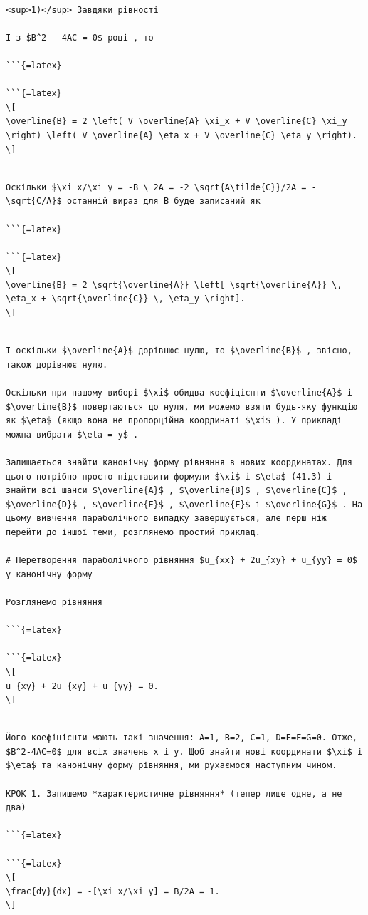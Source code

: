 \documentclass[
]{article}
\begin{document}
\begin{verbatim}

<sup>1)</sup> Завдяки рівності

І з $B^2 - 4AC = 0$ році , то

```{=latex}

```{=latex}
\[
\overline{B} = 2 \left( V \overline{A} \xi_x + V \overline{C} \xi_y \right) \left( V \overline{A} \eta_x + V \overline{C} \eta_y \right).
\]
\end{verbatim}

\begin{verbatim}

Оскільки $\xi_x/\xi_y = -B \ 2A = -2 \sqrt{A\tilde{C}}/2A = -\sqrt{C/A}$ останній вираз для B буде записаний як

```{=latex}

```{=latex}
\[
\overline{B} = 2 \sqrt{\overline{A}} \left[ \sqrt{\overline{A}} \, \eta_x + \sqrt{\overline{C}} \, \eta_y \right].
\]
\end{verbatim}

\begin{verbatim}

І оскільки $\overline{A}$ дорівнює нулю, то $\overline{B}$ , звісно, також дорівнює нулю.

Оскільки при нашому виборі $\xi$ обидва коефіцієнти $\overline{A}$ і $\overline{B}$ повертаються до нуля, ми можемо взяти будь-яку функцію як $\eta$ (якщо вона не пропорційна координаті $\xi$ ). У прикладі можна вибрати $\eta = y$ .

Залишається знайти канонічну форму рівняння в нових координатах. Для цього потрібно просто підставити формули $\xi$ і $\eta$ (41.3) і знайти всі шанси $\overline{A}$ , $\overline{B}$ , $\overline{C}$ , $\overline{D}$ , $\overline{E}$ , $\overline{F}$ і $\overline{G}$ . На цьому вивчення параболічного випадку завершується, але перш ніж перейти до іншої теми, розглянемо простий приклад.

# Перетворення параболічного рівняння $u_{xx} + 2u_{xy} + u_{yy} = 0$ у канонічну форму

Розглянемо рівняння

```{=latex}

```{=latex}
\[
u_{xy} + 2u_{xy} + u_{yy} = 0.
\]
\end{verbatim}

\begin{verbatim}

Його коефіцієнти мають такі значення: A=1, B=2, C=1, D=E=F=G=0. Отже, $B^2-4AC=0$ для всіх значень x і y. Щоб знайти нові координати $\xi$ і $\eta$ та канонічну форму рівняння, ми рухаємося наступним чином.

КРОК 1. Запишемо *характеристичне рівняння* (тепер лише одне, а не два)

```{=latex}

```{=latex}
\[
\frac{dy}{dx} = -[\xi_x/\xi_y] = B/2A = 1.
\]
\end{verbatim}
\end{document}
